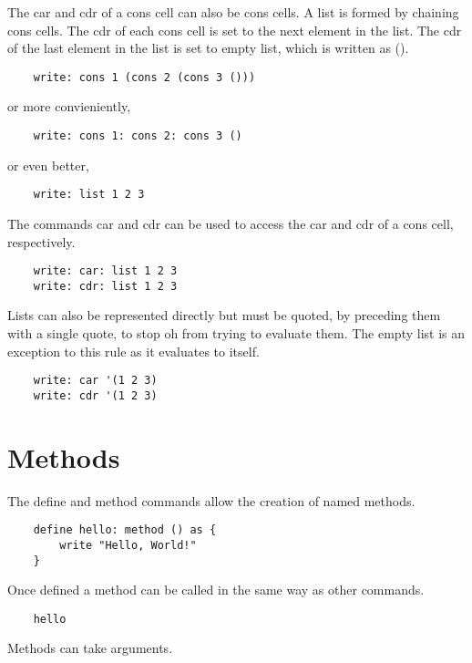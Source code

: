 \documentclass[12pt]{book}
\begin{document}
The car and cdr of a cons cell can also be cons cells. A list is formed
by chaining cons cells. The cdr of each cons cell is set to the next
element in the list. The cdr of the last element in the list is set to
empty list, which is written as ().

\begin{lstlisting}
	write: cons 1 (cons 2 (cons 3 ()))
\end{lstlisting}

or more convieniently,

\begin{lstlisting}
	write: cons 1: cons 2: cons 3 ()
\end{lstlisting}

or even better,

\begin{lstlisting}
	write: list 1 2 3
\end{lstlisting}

The commands car and cdr can be used to access the car and cdr of a
cons cell, respectively.

\begin{lstlisting}
	write: car: list 1 2 3
	write: cdr: list 1 2 3
\end{lstlisting}

Lists can also be represented directly but must be quoted, by preceding
them with a single quote, to stop oh from trying to evaluate them. The
empty list is an exception to this rule as it evaluates to itself.

\begin{lstlisting}
	write: car '(1 2 3)
	write: cdr '(1 2 3)
\end{lstlisting}


\section{Methods}

The define and method commands allow the creation of named methods.

\begin{lstlisting}
	define hello: method () as {
		write "Hello, World!"
	}
\end{lstlisting}

Once defined a method can be called in the same way as other commands.

\begin{lstlisting}
	hello
\end{lstlisting}

Methods can take arguments.
\end{document}
